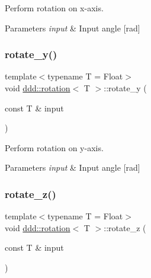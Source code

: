 Perform rotation on x-\/axis. 


\begin{DoxyParams}{Parameters}
{\em input} & Input angle \mbox{[}rad\mbox{]} \\
\hline
\end{DoxyParams}
\mbox{\label{classddd_1_1rotation_a4f883c5c4c736387fa14f1362d90a90c}} 
\subsubsection{\texorpdfstring{rotate\+\_\+y()}{rotate\_y()}}
{\footnotesize\ttfamily template$<$typename T  = Float$>$ \\
void \hyperlink{classddd_1_1rotation}{ddd\+::rotation}$<$ T $>$\+::rotate\+\_\+y (\begin{DoxyParamCaption}\item[{const T \&}]{input }\end{DoxyParamCaption})\hspace{0.3cm}{\ttfamily [inline]}}



Perform rotation on y-\/axis. 


\begin{DoxyParams}{Parameters}
{\em input} & Input angle \mbox{[}rad\mbox{]} \\
\hline
\end{DoxyParams}
\mbox{\label{classddd_1_1rotation_a3ef52c0cd324e1ef83fcb65dba746e10}} 
\subsubsection{\texorpdfstring{rotate\+\_\+z()}{rotate\_z()}}
{\footnotesize\ttfamily template$<$typename T  = Float$>$ \\
void \hyperlink{classddd_1_1rotation}{ddd\+::rotation}$<$ T $>$\+::rotate\+\_\+z (\begin{DoxyParamCaption}\item[{const T \&}]{input }\end{DoxyParamCaption})\hspace{0.3cm}{\ttfamily [inline]}}



